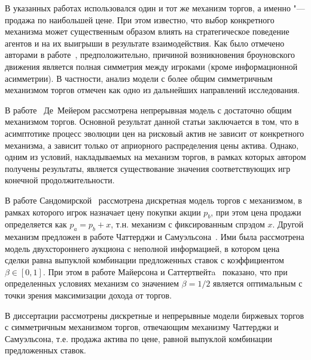
В указанных работах использовался один и тот же механизм торгов, а именно "---
продажа по наибольшей цене. При этом известно, что выбор конкретного механизма
может существенным образом влиять на стратегическое поведение агентов и на их
выигрыши в результате взаимодействия. Как было отмечено авторами в
работе~\cite{demeyer02}, предположительно, причиной возникновения броуновского
движения является полная симметрия между игроками (кроме информационной
асимметрии). В частности, анализ модели с более общим симметричным механизмом
торгов отмечен как одно из дальнейших направлений исследования.

В работе~\cite{demeyer10} Де~Мейером рассмотрена непрерывная модель с достаточно
общим механизмом торгов. Основной результат данной статьи заключается в том, что
в асимптотике процесс эволюции цен на рисковый актив не зависит от конкретного
механизма, а зависит только от априорного распределения цены актива. Однако,
одним из условий, накладываемых на механизм торгов, в рамках которых автором
получены результаты, является существование значения соответствующих игр
конечной продолжительности.

В работе Сандомирской~\cite{sandomirskaya14} рассмотрена дискретная модель
торгов с механизмом, в рамках которого игрок назначает цену покупки акции $p_b$,
при этом цена продажи определяется как $p_a = p_b + x$, т.н. механизм с
фиксированным спрэдом $x$. Другой механизм предложен в работе Чаттерджи и
Самуэльсона~\cite{chatterjee83}. Ими была рассмотрена модель двухстороннего
аукциона с неполной информацией, в котором цена сделки равна выпуклой комбинации
предложенных ставок с коэффициентом $\beta \in [0, 1]$. При этом в работе
Майерсона и Саттертвейтa~\cite{myerson83} показано, что при определенных
условиях механизм со значением $\beta = 1/2$ является оптимальным с точки зрения
максимизации дохода от торгов.

{\progress} В диссертации рассмотрены дискретные и непрерывные модели биржевых
торгов с симметричным механизмом торгов, отвечающим механизму Чаттерджи и
Самуэльсона, т.е. продажа актива по цене, равной выпуклой комбинации
предложенных ставок.

